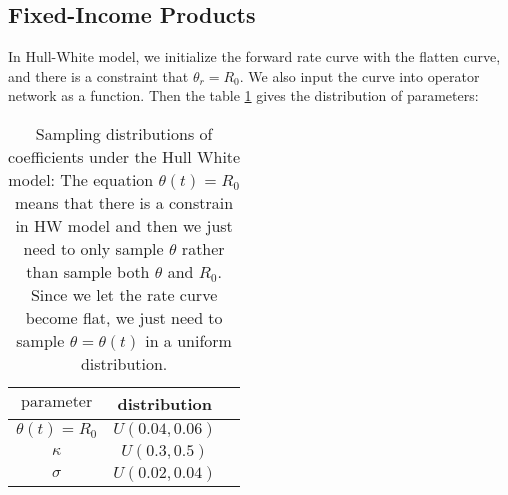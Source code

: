 \documentclass[11pt,a4paper]{article}
\theoremstyle{remark}
\begin{document}
	
	
	
	
	\fi
	
	
	
	
	
	
	
	
	
	
	
	
	
	
	
	
	\subsection{Fixed-Income Products}
	In Hull-White model, we initialize the forward rate curve with the flatten curve, and there is a constraint that  $\theta_r = R_0$.  We also input the curve into operator network as a function. Then the table \ref{tab:dist-HW} gives the distribution of parameters:
	\begin{table}[htbp!]
		\centering
		\begin{tabular}{ccc}
			\hline
			$\text{parameter}$    &   distribution  \\
			\hline
			$\theta(t) = R_0$   & $U(0.04, 0.06)$ \\
			$\kappa$  & $U(0.3, 0.5)$ \\
			$\sigma$  & $U(0.02, 0.04)$ \\
			\hline
		\end{tabular}%
		\caption{Sampling distributions of coefficients under the Hull White model: The equation $\theta(t) = R_0$ means that there is a constrain in HW model and then we just need to only sample $\theta$ rather than sample both $\theta$ and $R_0$. Since we let the rate curve become flat, we just need to sample $\theta = \theta(t)$ in a uniform distribution.}
		\label{tab:dist-HW}%
	\end{table}%
\end{document}
